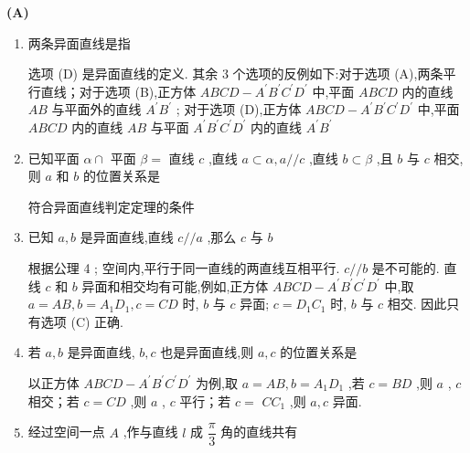 \begin{center}  \textbf{(A)} \end{center}
\begin{enumerate}
    \item 两条异面直线是指
    \begin{jieda}
        选项 (D) 是异面直线的定义. 其余 3 个选项的反例如下:对于选项 (A),两条平行直线；对于选项 (B),正方体 ${ABCD} - {A}^{\prime }{B}^{\prime }{C}^{\prime }{D}^{\prime }$ 中,平面 ${ABCD}$ 内的直线 ${AB}$ 与平面外的直线 ${A}^{\prime }{B}^{\prime }$ ; 对于选项 (D),正方体 ${ABCD} - {A}^{\prime }{B}^{\prime }{C}^{\prime }{D}^{\prime }$ 中,平面 ${ABCD}$ 内的直线 ${AB}$ 与平面 ${A}^{\prime }{B}^{\prime }{C}^{\prime }{D}^{\prime }$ 内的直线 ${A}^{\prime }{B}^{\prime }$
    \end{jieda}
    \item 已知平面 $\alpha  \cap$ 平面 $\beta  =$ 直线 $c$ ,直线 $a \subset  \alpha ,a//c$ ,直线 $b \subset  \beta$ ,且 $b$ 与 $c$ 相交,则 $a$ 和 $b$ 的位置关系是
    \begin{jieda}
        符合异面直线判定定理的条件
    \end{jieda}
    \item 已知 $a,b$ 是异面直线,直线 $c//a$ ,那么 $c$ 与 $b$ 
    \begin{jieda}
        根据公理 4 ; 空间内,平行于同一直线的两直线互相平行. $c//b$ 是不可能的. 直线 $c$ 和 $b$ 异面和相交均有可能,例如,正方体 ${ABCD} - {A}^{\prime }{B}^{\prime }{C}^{\prime }{D}^{\prime }$ 中,取 $a = {AB},b = {A}_{1}{D}_{1},c = {CD}$ 时, $b$ 与 $c$ 异面; $c = {D}_{1}{C}_{1}$ 时, $b$ 与 $c$ 相交. 因此只有选项 (C) 正确.
    \end{jieda}
    \item 若 $a,b$ 是异面直线, $b,c$ 也是异面直线,则 $a,c$ 的位置关系是
    \begin{jieda}
        以正方体 ${ABCD} - {A}^{\prime }{B}^{\prime }{C}^{\prime }{D}^{\prime }$ 为例,取 $a = {AB},b = {A}_{1}{D}_{1}$ ,若 $c = {BD}$ ,则 $a$ , $c$ 相交；若 $c = {CD}$ ,则 $a$ , $c$ 平行；若 $c =$  $C{C}_{1}$ ,则 $a,c$ 异面.
    \end{jieda}
    \item 经过空间一点 $A$ ,作与直线 $l$ 成 $\dfrac{\pi }{3}$ 角的直线共有 

\end{enumerate}
